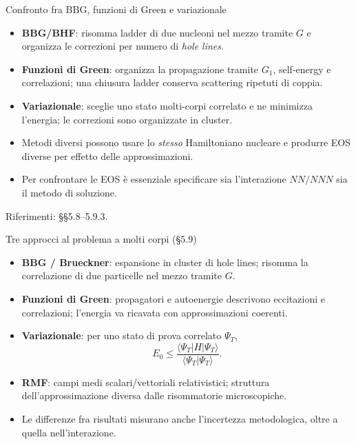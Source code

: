 \begin{frame}[t]{Confronto fra BBG, funzioni di Green e variazionale}
\small
\begin{itemize}
\item \textbf{BBG/BHF}: risomma ladder di due nucleoni nel mezzo tramite $G$ e organizza le correzioni per numero di \emph{hole lines}.
\item \textbf{Funzioni di Green}: organizza la propagazione tramite $G_1$, self-energy e correlazioni; una chiusura ladder conserva scattering ripetuti di coppia.
\item \textbf{Variazionale}: sceglie uno stato molti-corpi correlato e ne minimizza l'energia; le correzioni sono organizzate in cluster.
\item Metodi diversi possono usare lo \emph{stesso} Hamiltoniano nucleare e produrre EOS diverse per effetto delle approssimazioni.
\item Per confrontare le EOS è essenziale specificare sia l'interazione $NN/NNN$ sia il metodo di soluzione.
\end{itemize}
{\footnotesize Riferimenti: §§5.8--5.9.3.}
\end{frame}

\begin{frame}[t]{Tre approcci al problema a molti corpi (§5.9)}
\small
\begin{itemize}
\item \textbf{BBG / Brueckner}: espansione in cluster di hole lines; risomma la correlazione di due particelle nel mezzo tramite $G$.
\item \textbf{Funzioni di Green}: propagatori e autoenergie descrivono eccitazioni e correlazioni; l'energia va ricavata con approssimazioni coerenti.
\item \textbf{Variazionale}: per uno stato di prova correlato $\Psi_T$, 
\[
E_0\le \frac{\langle\Psi_T|H|\Psi_T\rangle}{\langle\Psi_T|\Psi_T\rangle}.
\]
\item \textbf{RMF}: campi medi scalari/vettoriali relativistici; struttura dell'approssimazione diversa dalle risommatorie microscopiche.
\item Le differenze fra risultati misurano anche l'incertezza metodologica, oltre a quella nell'interazione.
\end{itemize}
\end{frame}


